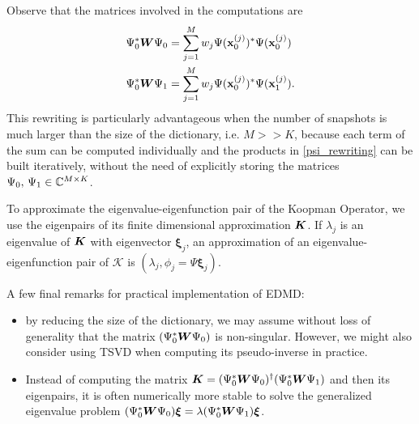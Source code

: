 Observe that the matrices involved in the computations are
\begin{equation*}
    \label{psi_rewriting}
    \begin{split}
        \Psi_0^*\vb*{W}\Psi_0 & = \sum_{j=1}^M w_j \Psi(\vb{x}_0^{(j)})^* \Psi(\vb{x}_0^{(j)})\\
        \Psi_0^*\vb*{W}\Psi_1 & = \sum_{j=1}^M w_j \Psi(\vb{x}_0^{(j)})^* \Psi(\vb{x}_1^{(j)}).
    \end{split}
\end{equation*}
This rewriting is particularly advantageous when the number of snapshots is much larger than the size of the dictionary, i.e. $M >> K$, because each term of the sum can be computed individually and the products in \eqref{psi_rewriting} can be built iteratively, without the need of explicitly storing the matrices $\Psi_0,\,\Psi_1\in\mathbb{C}^{M\times K}$.

To approximate the eigenvalue-eigenfunction pair of the Koopman Operator, we use the eigenpairs of its finite dimensional approximation $\vb*{K}$. If $\lambda_j$ is an eigenvalue of $\vb*{K}$ with eigenvector $\bm{\xi}_j$, an approximation of an eigenvalue-eigenfunction pair of $\mathcal{K}$ is $(\lambda_j, \phi_j = \Psi\bm{\xi}_j)$.

A few final remarks for practical implementation of EDMD:
\begin{itemize}
    \item by reducing the size of the dictionary, we may assume without loss of generality that the matrix $(\Psi_0^*\vb*{W}\Psi_0)$ is non-singular. However, we might also consider using TSVD when computing its pseudo-inverse in practice.  
    \item Instead of computing the matrix $\vb*{K} = (\Psi_0^*\vb*{W}\Psi_0)^{\dagger}(\Psi_0^*\vb*{W}\Psi_1)$ and then its eigenpairs, it is often numerically more stable to solve the generalized eigenvalue problem $(\Psi_0^*\vb*{W}\Psi_0)\bm{\xi} = \lambda(\Psi_0^*\vb*{W}\Psi_1)\bm{\xi}$.
\end{itemize}


